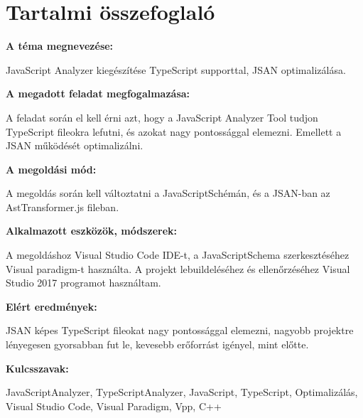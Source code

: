 \chapter*{Tartalmi összefoglaló}

\noindent\textbf{A téma megnevezése:}

JavaScript Analyzer kiegészítése TypeScript supporttal, JSAN optimalizálása.

\noindent\textbf{A megadott feladat megfogalmazása:}

A feladat során el kell érni azt, hogy a JavaScript Analyzer Tool tudjon TypeScript fileokra lefutni, és azokat nagy pontossággal elemezni. 
Emellett a JSAN működését optimalizálni.

\noindent\textbf{A megoldási mód:}

A megoldás során kell változtatni a JavaScriptSchémán, és a JSAN-ban az AstTransformer.js fileban.

\noindent\textbf{Alkalmazott eszközök, módszerek:}

A megoldáshoz Visual Studio Code IDE-t, a JavaScriptSchema szerkesztéséhez Visual paradigm-t használta.
A projekt lebuildeléséhez és ellenőrzéséhez Visual Studio 2017 programot használtam.

\noindent\textbf{Elért eredmények:}

JSAN képes TypeScript fileokat nagy pontossággal elemezni, nagyobb projektre lényegesen gyorsabban fut le, kevesebb erőforrást igényel, mint előtte.

\noindent\textbf{Kulcsszavak:}

JavaScriptAnalyzer, TypeScriptAnalyzer, JavaScript, TypeScript, Optimalizálás, Visual Studio Code, Visual Paradigm, Vpp, C++
